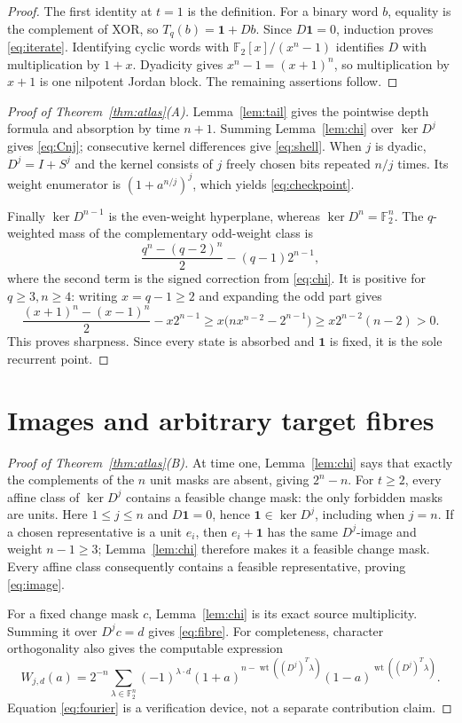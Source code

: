 \documentclass[a4paper,10pt]{amsart}
\theoremstyle{remark}
\newcommand{\F}{\mathbb F}
\newcommand{\one}{\boldsymbol 1}
\newcommand{\wt}{\operatorname{wt}}
\begin{document}
\begin{proof}
The first identity at $t=1$ is the definition.  For a binary word $b$,
equality is the complement of XOR, so $T_q(b)=\one+Db$.  Since $D\one=0$,
induction proves \eqref{eq:iterate}.  Identifying cyclic words with
$\F_2[x]/(x^n-1)$ identifies $D$ with multiplication by $1+x$.  Dyadicity
gives $x^n-1=(x+1)^n$, so multiplication by $x+1$ is one nilpotent Jordan
block.  The remaining assertions follow.
\end{proof}

\begin{proof}[Proof of Theorem~\ref{thm:atlas}(A)]
Lemma~\ref{lem:tail} gives the pointwise depth formula and absorption by time
$n+1$.  Summing Lemma~\ref{lem:chi} over $\ker D^j$ gives
\eqref{eq:Cnj}; consecutive kernel differences give \eqref{eq:shell}.
When $j$ is dyadic, $D^j=I+S^j$ and the kernel consists of $j$ freely chosen
bits repeated $n/j$ times.  Its weight enumerator is
$(1+a^{n/j})^j$, which yields \eqref{eq:checkpoint}.

Finally $\ker D^{n-1}$ is the even-weight hyperplane, whereas
$\ker D^n=\F_2^n$.  The $q$-weighted mass of the complementary odd-weight
class is
\[
 \frac{q^n-(q-2)^n}{2}-(q-1)2^{n-1},
\]
where the second term is the signed correction from \eqref{eq:chi}.  It is
positive for $q\geq3,n\geq4$: writing $x=q-1\geq2$ and expanding the odd
part gives
\[
 \frac{(x+1)^n-(x-1)^n}{2}-x2^{n-1}
 \geq x\bigl(nx^{n-2}-2^{n-1}\bigr)
 \geq x2^{n-2}(n-2)>0.
\]
This proves sharpness.  Since every state is absorbed and $\one$ is fixed,
it is the sole recurrent point.
\end{proof}

\section{Images and arbitrary target fibres}

\begin{proof}[Proof of Theorem~\ref{thm:atlas}(B)]
At time one, Lemma~\ref{lem:chi} says that exactly the complements of the
$n$ unit masks are absent, giving $2^n-n$.  For $t\geq2$, every affine
class of $\ker D^j$ contains a feasible change mask: the only forbidden
masks are units.  Here $1\leq j\leq n$ and $D\one=0$, hence
$\one\in\ker D^j$, including when $j=n$.  If a chosen representative is a
unit $e_i$, then $e_i+\one$ has the same $D^j$-image and weight
$n-1\geq3$; Lemma~\ref{lem:chi} therefore makes it a feasible change mask.
Every affine class consequently contains a feasible representative, proving
\eqref{eq:image}.

For a fixed change mask $c$, Lemma~\ref{lem:chi} is its exact source
multiplicity.  Summing it over $D^jc=d$ gives \eqref{eq:fibre}.  For
completeness, character orthogonality also gives the computable expression
\begin{equation}\label{eq:fourier}
 W_{j,d}(a)=2^{-n}\sum_{\lambda\in\F_2^n}(-1)^{\lambda\cdot d}
 (1+a)^{n-\wt((D^j)^T\lambda)}
 (1-a)^{\wt((D^j)^T\lambda)}.
\end{equation}
Equation \eqref{eq:fourier} is a verification device, not a separate
contribution claim.
\end{proof}
\end{document}
